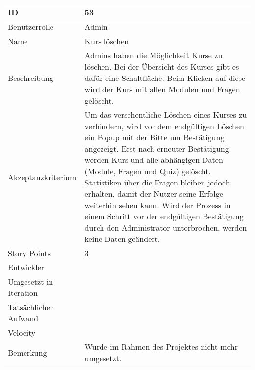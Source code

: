 \begin{tabularx}{\textwidth}{|p{}|X|}
	\hline
	ID & 53\\
	\hline
	Benutzerrolle & Admin\\
	\hline
	Name & Kurs löschen\\
	\hline
	Beschreibung & Admins haben die Möglichkeit Kurse zu löschen. Bei der Übersicht des Kurses
	gibt es dafür eine Schaltfläche. Beim Klicken auf diese wird der Kurs mit allen Modulen
	und Fragen gelöscht.\\
	\hline
	Akzeptanzkriterium & Um das versehentliche Löschen eines Kurses zu verhindern, wird vor dem
	endgültigen Löschen ein Popup mit der Bitte um Bestätigung angezeigt. Erst nach erneuter
	Bestätigung werden Kurs und alle abhängigen Daten (Module, Fragen und Quiz) gelöscht.
	Statistiken über die Fragen bleiben jedoch erhalten, damit der Nutzer seine Erfolge
	weiterhin sehen kann. Wird der Prozess in einem Schritt vor der endgültigen Bestätigung
	durch den Administrator unterbrochen, werden keine Daten geändert.\\
	\hline
	Story Points & 3\\
	\hline
	Entwickler & \\
	\hline
	Umgesetzt in Iteration & \\
	\hline
	Tatsächlicher Aufwand & \\
	\hline
	Velocity & \\
	\hline
	Bemerkung & Wurde im Rahmen des Projektes nicht mehr umgesetzt.\\
	\hline
\end{tabularx}
\vspace{20pt}

